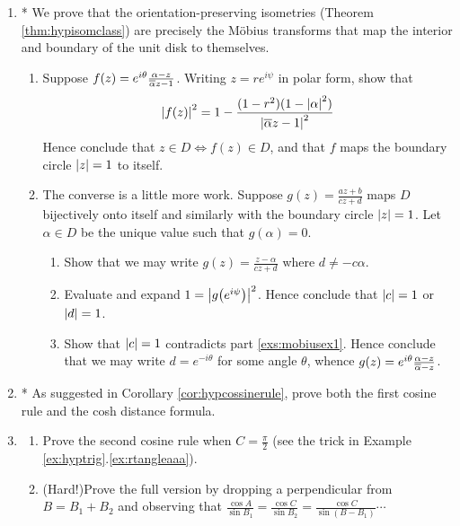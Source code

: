 \begin{exercises}
\begin{enumerate}
	  
	  \item\label{exs:mobiusex}* We prove that the orientation-preserving isometries (Theorem \ref{thm:hypisomclass}) are precisely the Möbius transforms that map the interior and boundary of the unit disk to themselves.
	  \begin{enumerate}
	    \item Suppose $f(z)=e^{i\theta}\frac{\alpha-z}{\overline{\alpha} z-1}$. Writing $z=re^{i\psi}$ in polar form, show that
	  	\[
	    	\left| f(z)\right|^2=1-\frac{(1-r^2)(1-\left| \alpha\right|^2)}{\left| \overline{\alpha} z-1\right|^2}
	  	\]
	   	Hence conclude that $z\in D\Longleftrightarrow f(z)\in D$, and that $f$ maps the boundary circle $\left| z\right|=1$ to itself.
	    \item The converse is a little more work. Suppose $g(z)=\frac{az+b}{cz+d}$ maps $D$ bijectively onto itself and similarly with the boundary circle $\left| z\right|=1$. Let $\alpha\in D$ be the unique value such that $g(\alpha)=0$.
	    \begin{enumerate}
	      \item\label{exs:mobiusex1} Show that we may write $g(z)=\frac{z-\alpha}{cz+d}$ where $d\neq -c\alpha$.
	    	\item Evaluate and expand $1=\left| g\big(e^{i\psi}\big)\right|^2$. Hence conclude that $\left| c\right|=1$ or $\left| d\right|=1$.
	    	\item Show that $\left| c\right|=1$ contradicts part \ref*{exs:mobiusex1}. Hence conclude that we may write $d=e^{-i\theta}$ for some angle $\theta$, whence $g(z)=e^{i\theta}\frac{\alpha-z}{\overline{\alpha}-z}$.
	  	\end{enumerate}
	  \end{enumerate}
		
		 
		\item * As suggested in Corollary \ref{cor:hypcossinerule}, prove both the first cosine rule and the cosh distance formula.
		
				
 		\item\label{exs:hcosruleII}
 		\begin{enumerate}
		  \item Prove the second cosine rule when $C=\frac\pi 2$ (see the trick in Example \ref*{ex:hyptrig}.\ref{ex:rtangleaaa}).
		  \item (Hard!)\lstsp Prove the full version by dropping a perpendicular from $B=B_1+B_2$ and observing that $\frac{\cos A}{\sin B_1}=\frac{\cos C}{\sin B_2}=\frac{\cos C}{\sin(B-B_1)}\cdots$
		\end{enumerate}
	\end{enumerate}
\end{exercises}


